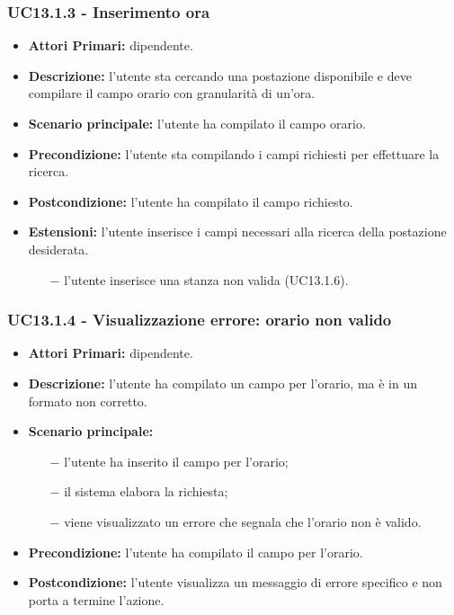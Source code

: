 \subsubsection{ UC13.1.3 - Inserimento ora }
\begin{itemize}
	\item\textbf{Attori Primari:} dipendente.
	\item\textbf{Descrizione:} l’utente sta cercando una postazione disponibile e deve compilare il campo orario con granularità di un'ora.
	\item\textbf{Scenario principale:} l’utente ha compilato il campo orario.
	\item\textbf{Precondizione:} l’utente sta compilando i campi richiesti per effettuare la ricerca.
	\item\textbf{Postcondizione:} l’utente ha compilato il campo richiesto.
	\item\textbf{Estensioni:} l’utente inserisce i campi necessari alla ricerca della postazione desiderata.
	\begin{itemize}
		\item[$-$] l’utente inserisce una stanza non valida (UC13.1.6).
	\end{itemize}
\end{itemize}
\subsubsection{ UC13.1.4 - Visualizzazione errore: orario non valido }
\begin{itemize}
	\item\textbf{Attori Primari:} dipendente.
	\item\textbf{Descrizione:} l’utente ha compilato un campo per l'orario, ma è in un formato non corretto.
	\item\textbf{Scenario principale:} 
	\begin{itemize}
		\item[$-$] l’utente ha inserito il campo per l'orario;
		\item[$-$] il sistema elabora la richiesta;
		\item[$-$] viene visualizzato un errore che segnala che l'orario non è valido.
	\end{itemize}
	\item\textbf{Precondizione:} l’utente ha compilato il campo per l'orario.
	\item\textbf{Postcondizione:} l’utente visualizza un messaggio di errore specifico e non porta a termine l’azione.
\end{itemize}
